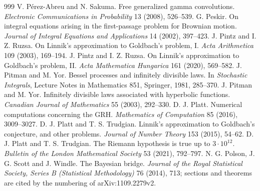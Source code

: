 \begin{thebibliography}{999}
 V. P\'erez-Abreu and N. Sakuma. Free generalized gamma convolutions. \emph{Electronic Communications in Probability} 13 (2008), 526--539.
 G. Peskir. On integral equations arising in the first-passage problem for Brownian motion. \emph{Journal of Integral Equations and Applications} 14 (2002), 397--423.
 J. Pintz and I. Z. Ruzsa. On Linnik's approximation to Goldbach's problem, I. \emph{Acta Arithmetica} 109 (2003), 169--194.
 J. Pintz and I. Z. Ruzsa. On Linnik's approximation to Goldbach's problem, II. \emph{Acta Mathematica Hungarica} 161 (2020), 569--582.
 J. Pitman and M. Yor. Bessel processes and infinitely divisible laws. In \emph{Stochastic Integrals}, Lecture Notes in Mathematics 851, Springer, 1981, 285--370.
 J. Pitman and M. Yor. Infinitely divisible laws associated with hyperbolic functions. \emph{Canadian Journal of Mathematics} 55 (2003), 292--330.
 D. J. Platt. Numerical computations concerning the GRH. \emph{Mathematics of Computation} 85 (2016), 3009--3027.
 D. J. Platt and T. S. Trudgian. Linnik's approximation to Goldbach's conjecture, and other problems. \emph{Journal of Number Theory} 153 (2015), 54--62.
 D. J. Platt and T. S. Trudgian. The Riemann hypothesis is true up to $3\cdot10^{12}$. \emph{Bulletin of the London Mathematical Society} 53 (2021), 792--797.
 N. G. Polson, J. G. Scott and J. Windle. The Bayesian bridge. \emph{Journal of the Royal Statistical Society, Series B (Statistical Methodology)} 76 (2014), 713; sections and theorems are cited by the numbering of arXiv:1109.2279v2.

\end{thebibliography}
